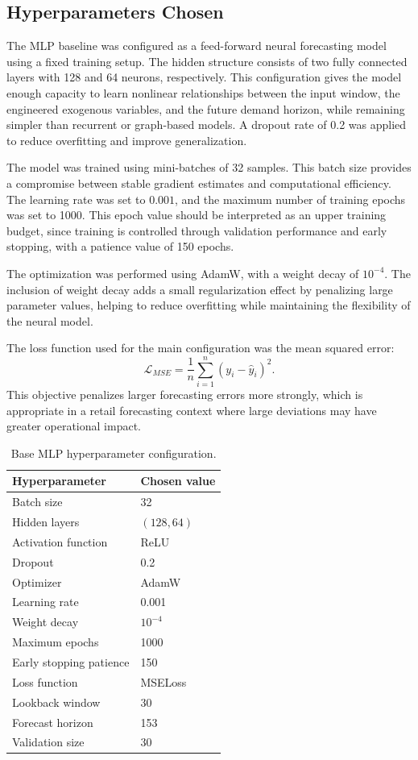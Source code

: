 \subsection{Hyperparameters Chosen}
\label{subsec:mlp_hyperparameters_chosen}

The MLP baseline was configured as a feed-forward neural forecasting model using a fixed training setup. The hidden structure consists of two fully connected layers with 128 and 64 neurons, respectively. This configuration gives the model enough capacity to learn nonlinear relationships between the input window, the engineered exogenous variables, and the future demand horizon, while remaining simpler than recurrent or graph-based models. A dropout rate of 0.2 was applied to reduce overfitting and improve generalization.

The model was trained using mini-batches of 32 samples. This batch size provides a compromise between stable gradient estimates and computational efficiency. The learning rate was set to \(0.001\), and the maximum number of training epochs was set to 1000. This epoch value should be interpreted as an upper training budget, since training is controlled through validation performance and early stopping, with a patience value of 150 epochs.

The optimization was performed using AdamW, with a weight decay of \(10^{-4}\). The inclusion of weight decay adds a small regularization effect by penalizing large parameter values, helping to reduce overfitting while maintaining the flexibility of the neural model.

The loss function used for the main configuration was the mean squared error:
\[
    \mathcal{L}_{MSE} =
    \frac{1}{n}\sum_{i=1}^{n}(y_i - \hat{y}_i)^2.
\]
This objective penalizes larger forecasting errors more strongly, which is appropriate in a retail forecasting context where large deviations may have greater operational impact.

\begin{table}[H]
\centering
\caption{Base MLP hyperparameter configuration.}
\label{tab:mlp_hyperparameters}
\begin{tabular}{ll}
\hline
\textbf{Hyperparameter} & \textbf{Chosen value} \\
\hline
Batch size & 32 \\
Hidden layers & $(128, 64)$ \\
Activation function & ReLU \\
Dropout & 0.2 \\
Optimizer & AdamW \\
Learning rate & 0.001 \\
Weight decay & $10^{-4}$ \\
Maximum epochs & 1000 \\
Early stopping patience & 150 \\
Loss function & MSELoss \\
Lookback window & 30 \\
Forecast horizon & 153 \\
Validation size & 30 \\
\hline
\end{tabular}
\end{table}


